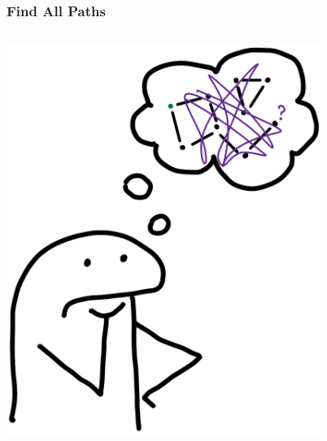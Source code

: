 \documentclass[xcolor={dvipsnames}, aspectratio=169]{beamer}
\begin{document}
\begin{frame}[fragile]
  \frametitle{Find All Paths}
  \begin{columns}    
    \begin{column}{0.35\textwidth}
      \centering
      \includegraphics[width=0.8\textwidth]{pic/allPaths.jpg}
    \end{column}
    \begin{column}{0.75\textwidth} 
      \begin{lstlisting}[language=imperative]

      \end{lstlisting}
    \end{column}
    \end{columns}
\end{frame}
\end{document}
